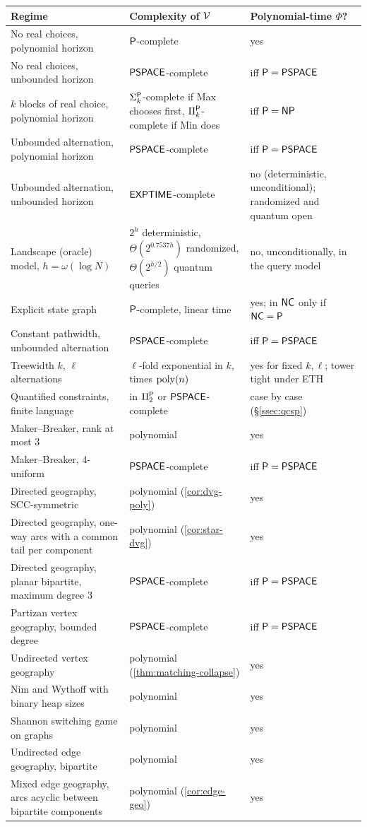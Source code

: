 \begin{center}
\small
\begin{longtable}{@{}L{0.36}L{0.32}L{0.25}@{}}
\toprule
Regime & Complexity of $\mathcal{V}$ & Polynomial-time $\Phi$?\\ \midrule\endhead
No real choices, polynomial horizon & $\mathsf{P}$-complete & yes\\
No real choices, unbounded horizon & $\mathsf{PSPACE}$-complete & iff $\mathsf{P}=\mathsf{PSPACE}$\\
$k$ blocks of real choice, polynomial horizon & $\Sigma_k^{\mathsf{P}}$-complete if Max chooses first, $\Pi_k^{\mathsf{P}}$-complete if Min does & iff $\mathsf{P}=\mathsf{NP}$\\
Unbounded alternation, polynomial horizon & $\mathsf{PSPACE}$-complete & iff $\mathsf{P}=\mathsf{PSPACE}$\\
Unbounded alternation, unbounded horizon & $\mathsf{EXPTIME}$-complete & no (deterministic, unconditional); randomized and quantum open\\
Landscape (oracle) model, $h=\omega(\log N)$ & $2^h$ deterministic, $\Theta(2^{0.7537h})$ randomized, $\Theta(2^{h/2})$ quantum queries & no, unconditionally, in the query model\\
Explicit state graph & $\mathsf{P}$-complete, linear time & yes; in $\mathsf{NC}$ only if $\mathsf{NC}=\mathsf{P}$\\
Constant pathwidth, unbounded alternation & $\mathsf{PSPACE}$-complete & iff $\mathsf{P}=\mathsf{PSPACE}$\\
Treewidth $k$, $\ell$ alternations & $\ell$-fold exponential in $k$, times $\operatorname{poly}(n)$ & yes for fixed $k,\ell$; tower tight under ETH\\
Quantified constraints, finite language & in $\Pi_2^{\mathsf{P}}$ or $\mathsf{PSPACE}$-complete & case by case (\S\ref{ssec:qcsp})\\
Maker--Breaker, rank at most $3$ & polynomial & yes\\
Maker--Breaker, $4$-uniform & $\mathsf{PSPACE}$-complete & iff $\mathsf{P}=\mathsf{PSPACE}$\\
Directed geography, SCC-symmetric & polynomial (\cref{cor:dvg-poly}) & yes\\
Directed geography, one-way arcs with a common tail per component & polynomial (\cref{cor:star-dvg}) & yes\\
Directed geography, planar bipartite, maximum degree $3$ & $\mathsf{PSPACE}$-complete & iff $\mathsf{P}=\mathsf{PSPACE}$\\
Partizan vertex geography, bounded degree & $\mathsf{PSPACE}$-complete & iff $\mathsf{P}=\mathsf{PSPACE}$\\
Undirected vertex geography & polynomial (\cref{thm:matching-collapse}) & yes\\
Nim and Wythoff with binary heap sizes & polynomial \cite{Bouton,Wythoff} & yes\\
Shannon switching game on graphs & polynomial \cite{Lehman,EdmondsPartition} & yes\\
Undirected edge geography, bipartite & polynomial \cite{FSU} & yes\\
Mixed edge geography, arcs acyclic between bipartite components & polynomial (\cref{cor:edge-geo}) & yes\\
\bottomrule
\end{longtable}
\end{center}
